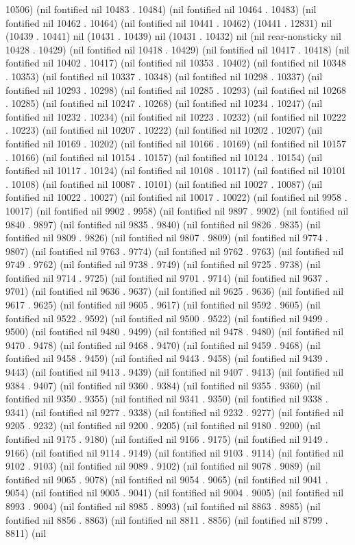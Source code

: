 10506) (nil fontified nil 10483 . 10484) (nil fontified nil 10464 . 10483) (nil fontified nil 10462 . 10464) (nil fontified nil 10441 . 10462) (10441 . 12831) nil (10439 . 10441) nil (10431 . 10439) nil (10431 . 10432) nil (nil rear-nonsticky nil 10428 . 10429) (nil fontified nil 10418 . 10429) (nil fontified nil 10417 . 10418) (nil fontified nil 10402 . 10417) (nil fontified nil 10353 . 10402) (nil fontified nil 10348 . 10353) (nil fontified nil 10337 . 10348) (nil fontified nil 10298 . 10337) (nil fontified nil 10293 . 10298) (nil fontified nil 10285 . 10293) (nil fontified nil 10268 . 10285) (nil fontified nil 10247 . 10268) (nil fontified nil 10234 . 10247) (nil fontified nil 10232 . 10234) (nil fontified nil 10223 . 10232) (nil fontified nil 10222 . 10223) (nil fontified nil 10207 . 10222) (nil fontified nil 10202 . 10207) (nil fontified nil 10169 . 10202) (nil fontified nil 10166 . 10169) (nil fontified nil 10157 . 10166) (nil fontified nil 10154 . 10157) (nil fontified nil 10124 . 10154) (nil fontified nil 10117 . 10124) (nil fontified nil 10108 . 10117) (nil fontified nil 10101 . 10108) (nil fontified nil 10087 . 10101) (nil fontified nil 10027 . 10087) (nil fontified nil 10022 . 10027) (nil fontified nil 10017 . 10022) (nil fontified nil 9958 . 10017) (nil fontified nil 9902 . 9958) (nil fontified nil 9897 . 9902) (nil fontified nil 9840 . 9897) (nil fontified nil 9835 . 9840) (nil fontified nil 9826 . 9835) (nil fontified nil 9809 . 9826) (nil fontified nil 9807 . 9809) (nil fontified nil 9774 . 9807) (nil fontified nil 9763 . 9774) (nil fontified nil 9762 . 9763) (nil fontified nil 9749 . 9762) (nil fontified nil 9738 . 9749) (nil fontified nil 9725 . 9738) (nil fontified nil 9714 . 9725) (nil fontified nil 9701 . 9714) (nil fontified nil 9637 . 9701) (nil fontified nil 9636 . 9637) (nil fontified nil 9625 . 9636) (nil fontified nil 9617 . 9625) (nil fontified nil 9605 . 9617) (nil fontified nil 9592 . 9605) (nil fontified nil 9522 . 9592) (nil fontified nil 9500 . 9522) (nil fontified nil 9499 . 9500) (nil fontified nil 9480 . 9499) (nil fontified nil 9478 . 9480) (nil fontified nil 9470 . 9478) (nil fontified nil 9468 . 9470) (nil fontified nil 9459 . 9468) (nil fontified nil 9458 . 9459) (nil fontified nil 9443 . 9458) (nil fontified nil 9439 . 9443) (nil fontified nil 9413 . 9439) (nil fontified nil 9407 . 9413) (nil fontified nil 9384 . 9407) (nil fontified nil 9360 . 9384) (nil fontified nil 9355 . 9360) (nil fontified nil 9350 . 9355) (nil fontified nil 9341 . 9350) (nil fontified nil 9338 . 9341) (nil fontified nil 9277 . 9338) (nil fontified nil 9232 . 9277) (nil fontified nil 9205 . 9232) (nil fontified nil 9200 . 9205) (nil fontified nil 9180 . 9200) (nil fontified nil 9175 . 9180) (nil fontified nil 9166 . 9175) (nil fontified nil 9149 . 9166) (nil fontified nil 9114 . 9149) (nil fontified nil 9103 . 9114) (nil fontified nil 9102 . 9103) (nil fontified nil 9089 . 9102) (nil fontified nil 9078 . 9089) (nil fontified nil 9065 . 9078) (nil fontified nil 9054 . 9065) (nil fontified nil 9041 . 9054) (nil fontified nil 9005 . 9041) (nil fontified nil 9004 . 9005) (nil fontified nil 8993 . 9004) (nil fontified nil 8985 . 8993) (nil fontified nil 8863 . 8985) (nil fontified nil 8856 . 8863) (nil fontified nil 8811 . 8856) (nil fontified nil 8799 . 8811) (nil 